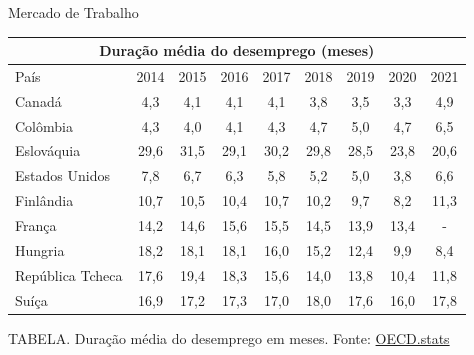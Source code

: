 \documentclass[10pt]{beamer}
\begin{document}
\begin{frame}{Mercado de Trabalho}
    \begin{footnotesize}
        \begin{table}[h!]
            \centering
            \begin{tabular}{ |l||c|c|c|c|c|c|c|c|  }
                \hline
                \multicolumn{9}{|c|}{Duração média do desemprego (meses)}                \\
                \hline
                \hline
                País             & 2014 & 2015 & 2016 & 2017 & 2018 & 2019 & 2020 & 2021 \\
                \hline
                \rowcolor{gray!10} Canadá           & 4,3  & 4,1  & 4,1  & 4,1  & 3,8  & 3,5  & 3,3  & 4,9  \\
                Colômbia         & 4,3  & 4,0  & 4,1  & 4,3  & 4,7  & 5,0  & 4,7  & 6,5  \\
                \rowcolor{gray!10} Eslováquia       & 29,6 & 31,5 & 29,1 & 30,2 & 29,8 & 28,5 & 23,8 & 20,6 \\
                Estados Unidos   & 7,8  & 6,7  & 6,3  & 5,8  & 5,2  & 5,0  & 3,8  & 6,6  \\
                \rowcolor{gray!10} Finlândia        & 10,7 & 10,5 & 10,4 & 10,7 & 10,2 & 9,7  & 8,2  & 11,3 \\
                França           & 14,2 & 14,6 & 15,6 & 15,5 & 14,5 & 13,9 & 13,4 & -    \\
                \rowcolor{gray!10} Hungria          & 18,2 & 18,1 & 18,1 & 16,0 & 15,2 & 12,4 & 9,9  & 8,4  \\
                República Tcheca & 17,6 & 19,4 & 18,3 & 15,6 & 14,0 & 13,8 & 10,4 & 11,8 \\
                \rowcolor{gray!10} Suíça            & 16,9 & 17,2 & 17,3 & 17,0 & 18,0 & 17,6 & 16,0 & 17,8 \\
                \hline
            \end{tabular}\vspace{.2cm}\newline
			\tiny{{\scshape TABELA.} Duração média do desemprego em meses. Fonte: \href{https://stats.oecd.org/index.aspx?DataSetCode=AVD_DUR}{OECD.stats}\newline}%
        \end{table}
    \end{footnotesize}
\end{frame}
\end{document}
